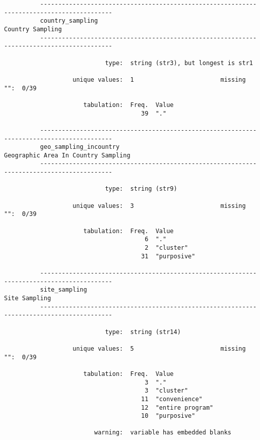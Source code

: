 \documentclass{article}
\begin{document}
\begin{verbatim}
          ------------------------------------------------------------------------------------------
          country_sampling                                                          Country Sampling
          ------------------------------------------------------------------------------------------
          
                            type:  string (str3), but longest is str1
          
                   unique values:  1                        missing "":  0/39
          
                      tabulation:  Freq.  Value
                                      39  "."
          
          ------------------------------------------------------------------------------------------
          geo_sampling_incountry                                 Geographic Area In Country Sampling
          ------------------------------------------------------------------------------------------
          
                            type:  string (str9)
          
                   unique values:  3                        missing "":  0/39
          
                      tabulation:  Freq.  Value
                                       6  "."
                                       2  "cluster"
                                      31  "purposive"
          
          ------------------------------------------------------------------------------------------
          site_sampling                                                                Site Sampling
          ------------------------------------------------------------------------------------------
          
                            type:  string (str14)
          
                   unique values:  5                        missing "":  0/39
          
                      tabulation:  Freq.  Value
                                       3  "."
                                       3  "cluster"
                                      11  "convenience"
                                      12  "entire program"
                                      10  "purposive"
          
                         warning:  variable has embedded blanks
          

\end{verbatim}
\end{document}
